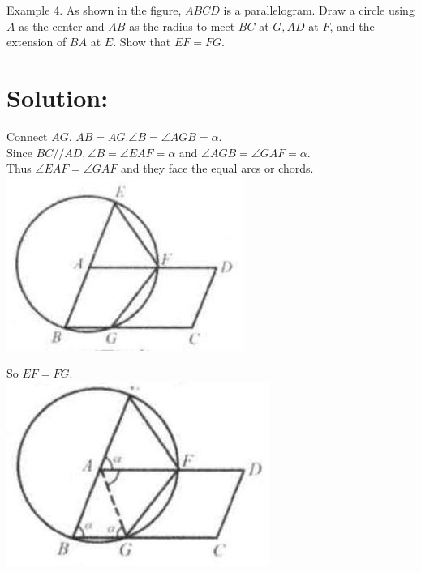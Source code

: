 \documentclass[10pt]{article}
\begin{document}
Example 4. As shown in the figure, \(A B C D\) is a parallelogram. Draw a circle using \(A\) as the center and \(A B\) as the radius to meet \(B C\) at \(G, A D\) at \(F\), and the extension of \(B A\) at \(E\). Show that \(E F=F G\).

\section*{Solution:}
Connect \(A G\). \(A B=A G . \angle B=\angle A G B=\alpha\).\\
Since \(B C / / A D, \angle B=\angle E A F=\alpha\) and \(\angle A G B=\angle G A F=\alpha\).\\
Thus \(\angle E A F=\angle G A F\) and they face the equal arcs or chords.\\
\includegraphics[max width=\textwidth, center]{2025_04_17_97bc1f7e44d93c271a88g-148(3)}

So \(E F=F G\).\\
\includegraphics[max width=\textwidth, center]{2025_04_17_97bc1f7e44d93c271a88g-148(2)}
\end{document}
